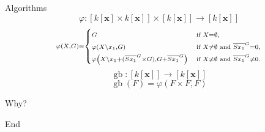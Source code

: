 \documentclass{beamer}
\DeclareMathOperator{\gb}{gb}
\def\and{\text{ and }}
\def\p{\varphi}
\begin{document}
\begin{frame}{Algorithms}
  \[ \scriptstyle \p: [k[\mathbf x] \times k[\mathbf x]] \times [k[\mathbf x]] \to [k[\mathbf x]] \]
  \[ \scriptstyle \p(X,G) = \begin{cases} \scriptstyle G &\scriptstyle\text{if } X = \emptyset, \\ \scriptstyle \p(X \setminus x_1,G) &\scriptstyle\text{if } X \ne \emptyset \and \overline{Sx_1}^{G} = 0, \\ \scriptstyle \scriptstyle \p\left(X \setminus x_1 + (\overline{Sx_1}^{G} \times G),G + \overline{Sx_1}^{G}\right) &\scriptstyle\text{if } X \ne \emptyset \and \overline{Sx_1}^{G} \ne 0. \end{cases} \]
  \[ \scriptstyle \gb: [k[\mathbf x]] \to [k[\mathbf x]] \]
  \[ \scriptstyle \gb(F) = \p(F \times F,F) \]
\end{frame}

\begin{frame}{Why?}
\end{frame}

\begin{frame}{End}
\end{frame}
\end{document}
